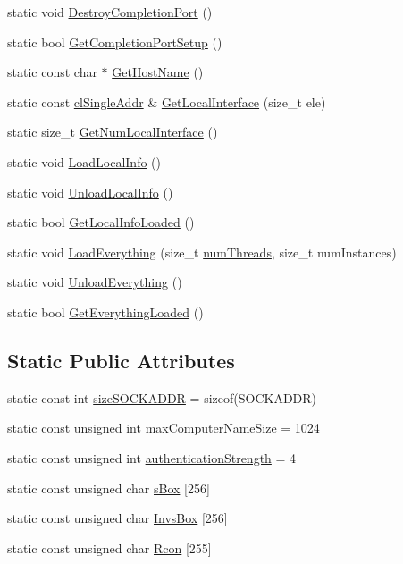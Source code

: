 \begin{DoxyCompactItemize}
\item 
static void \hyperlink{classcl_networking_utility_adf862e88969c0a67a4c797e2ba7781f5}{DestroyCompletionPort} ()
\item 
static bool \hyperlink{classcl_networking_utility_a427355d520c94801991e4a99e70cc766}{GetCompletionPortSetup} ()
\item 
static const char $\ast$ \hyperlink{classcl_networking_utility_a691b171a9374e81ff3bab468f29b5420}{GetHostName} ()
\item 
static const \hyperlink{classcl_single_addr}{clSingleAddr} \& \hyperlink{classcl_networking_utility_a8600ac52b9988fa567fe2c098cf4b2f5}{GetLocalInterface} (size\_\-t ele)
\item 
static size\_\-t \hyperlink{classcl_networking_utility_abaed0dfdad0f06cdf5a92fc2832d4471}{GetNumLocalInterface} ()
\item 
static void \hyperlink{classcl_networking_utility_ad6fcd956b0311f0cfa6750fa26d4822c}{LoadLocalInfo} ()
\item 
static void \hyperlink{classcl_networking_utility_acdc7e675cebdca790279a7ba79f28aae}{UnloadLocalInfo} ()
\item 
static bool \hyperlink{classcl_networking_utility_adfe14a3e01045dba16bffe1e78145907}{GetLocalInfoLoaded} ()
\item 
static void \hyperlink{classcl_networking_utility_a2ee6a20532489b67b0ed53407af24765}{LoadEverything} (size\_\-t \hyperlink{classcl_networking_utility_a7f033e0caca77ee312fad6b54c224dad}{numThreads}, size\_\-t numInstances)
\item 
static void \hyperlink{classcl_networking_utility_afab7e0022682f7912e84ad6e51b739d1}{UnloadEverything} ()
\item 
static bool \hyperlink{classcl_networking_utility_a162f48b7558541ace8dfc3817b587904}{GetEverythingLoaded} ()
\end{DoxyCompactItemize}
\subsection*{Static Public Attributes}
\begin{DoxyCompactItemize}
\item 
static const int \hyperlink{classcl_networking_utility_a770140d003b41cb571e83988a96c9c50}{sizeSOCKADDR} = sizeof(SOCKADDR)
\item 
static const unsigned int \hyperlink{classcl_networking_utility_a7b9a1b2da15e1d1174070a2aca194940}{maxComputerNameSize} = 1024
\item 
static const unsigned int \hyperlink{classcl_networking_utility_aa48d05605a3161f1b99b1dac14e05774}{authenticationStrength} = 4
\item 
static const unsigned char \hyperlink{classcl_networking_utility_af84431055c223f65227359514898c157}{sBox} \mbox{[}256\mbox{]}
\item 
static const unsigned char \hyperlink{classcl_networking_utility_a73955d828bc2ad72bb1a98fff2de244c}{InvsBox} \mbox{[}256\mbox{]}
\item 
static const unsigned char \hyperlink{classcl_networking_utility_af4c64288219ccb6c22d3ea07ec19b291}{Rcon} \mbox{[}255\mbox{]}
\end{DoxyCompactItemize}
